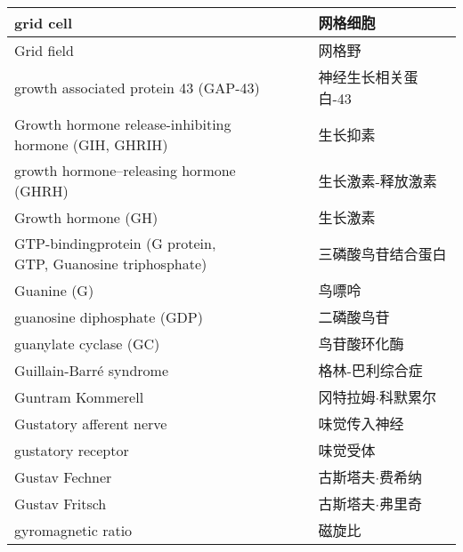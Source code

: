 \begin{longtable}{lll}
	\midrule
	grid cell     &&  	网格细胞  \\
	
	\midrule
	Grid field     &&  	网格野  \\
	
	\midrule
	growth associated protein 43  (GAP-43)   &&  神经生长相关蛋白-43  \\
	
	\midrule
	\makecell[l]{Growth hormone release-inhibiting \\hormone (GIH, GHRIH)}  &&  生长抑素  \\
	
	\midrule
	growth hormone–releasing hormone (GHRH)  &&  生长激素-释放激素  \\
	
	\midrule
	Growth hormone (GH)  &&  生长激素  \\
	
	\midrule
	\makecell[l]{GTP-bindingprotein (G protein,\\ GTP, Guanosine triphosphate)}     &&  三磷酸鸟苷结合蛋白  \\
	
	\midrule
	Guanine (G)     &&  鸟嘌呤  \\
	
	\midrule
	guanosine diphosphate (GDP)    &&  二磷酸鸟苷  \\
	
	\midrule
	guanylate cyclase (GC)    &&  鸟苷酸环化酶  \\
	
	\midrule
	Guillain-Barré syndrome   &&  格林-巴利综合症  \\
	
	\midrule
	Guntram Kommerell   &&  冈特拉姆$\cdot$科默累尔  \\
	
	\midrule
	Gustatory afferent nerve     &&  味觉传入神经  \\
	
	\midrule
	gustatory receptor     &&  味觉受体  \\
	
	\midrule
	Gustav Fechner     &&  古斯塔夫$\cdot$费希纳  \\
	
	\midrule
	Gustav Fritsch     &&  古斯塔夫$\cdot$弗里奇  \\
	
	\midrule
	gyromagnetic ratio     &&  磁旋比  \\
	

\end{longtable}
